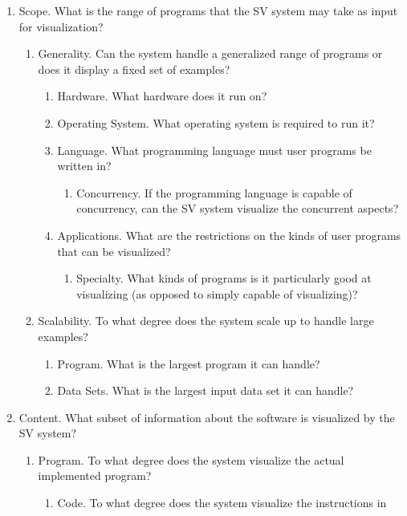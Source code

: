 \begin{enumerate}
  \item Scope. What is the range of programs that the SV system may take as
  input for visualization?
  \begin{enumerate}
    \item Generality. Can the system handle a generalized range of programs or
    does it display a fixed set of examples?
    \begin{enumerate}
      \item Hardware. What hardware does it run on?
      \item Operating System. What operating system is required to run it?
      \item Language. What programming language must user programs be written
      in?
      \begin{enumerate}
        \item Concurrency. If the programming language is capable of
        concurrency, can the SV system visualize the concurrent aspects?
      \end{enumerate}
      \item Applications. What are the restrictions on the kinds of user
      programs that can be visualized?
      \begin{enumerate}
        \item Specialty. What kinds of programs is it particularly good at
        visualizing (as opposed to simply capable of visualizing)?
      \end{enumerate}
    \end{enumerate}
    \item Scalability. To what degree does the system scale up to handle large
    examples?
    \begin{enumerate}
      \item Program. What is the largest program it can handle?
      \item Data Sets. What is the largest input data set it can handle?
    \end{enumerate}
  \end{enumerate}
  \item Content. What subset of information about the software is visualized by
  the SV system?
  \begin{enumerate}
    \item Program. To what degree does the system visualize the actual
    implemented program?
    \begin{enumerate}
      \item Code. To what degree does the system visualize the instructions in

\end{enumerate}
\end{enumerate}
\end{enumerate}
